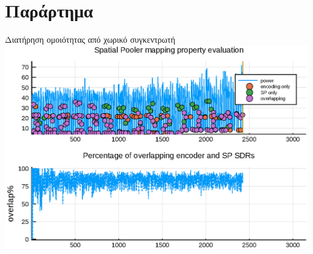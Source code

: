 \documentclass[10pt,lualatex]{beamer}
\begin{document}
\begin{frame}
  \printbibliography[title=Βιβλιογραφία]
\end{frame}

\section{Παράρτημα}
\begin{frame}{Διατήρηση ομοιότητας από χωρικό συγκεντρωτή}
	\includegraphics[width=\textwidth]{../figures/sp3}
\end{frame}
\end{document}
